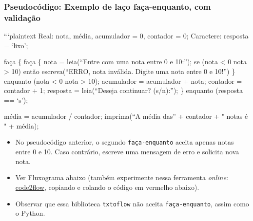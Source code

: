 \documentclass[12pt,a4paper]{article}
\providecommand{\tightlist}{%
      \setlength{\itemsep}{0pt}\setlength{\parskip}{0pt}}
\begin{document}
    \hypertarget{pseudocuxf3digo-exemplo-de-lauxe7o-fauxe7a-enquanto-com-validauxe7uxe3o}{%
\subsubsection{Pseudocódigo: Exemplo de laço faça-enquanto, com
validação}\label{pseudocuxf3digo-exemplo-de-lauxe7o-fauxe7a-enquanto-com-validauxe7uxe3o}}

```plaintext Real: nota, média, acumulador = 0, contador = 0; Caractere:
resposta = `lixo';

faça \{ faça \{ nota = leia(``Entre com uma nota entre 0 e 10:''); se
(nota \textless{} 0 \textbar{}\textbar{} nota \textgreater{} 10) então
escreva(``ERRO, nota inválida. Digite uma nota entre 0 e 10!'') \}
enquanto (nota \textless{} 0 \textbar{}\textbar{} nota \textgreater{}
10); acumulador = acumulador + nota; contador = contador + 1; resposta =
leia(``Deseja continuar? (s/n):''); \} enquanto (resposta == `s');

média = acumulador / contador; imprima(``A média das'' + contador + "
notas é " + média);

    \begin{itemize}
\tightlist
\item
  No pseudocódigo anterior, o segundo \texttt{faça-enquanto} aceita
  apenas notas entre 0 e 10. Caso contrário, escreve uma mensagem de
  erro e solicita nova nota.
\end{itemize}

    \begin{itemize}
\item
  Ver Fluxograma abaixo (também experimente nessa ferramenta
  \emph{online}: \href{https://app.code2flow.com/}{code2flow}, copiando
  e colando o código em vermelho abaixo).
\item
  Observar que essa biblioteca \texttt{txtoflow} não aceita
  \texttt{faça-enquanto}, assim como o Python.
\end{itemize}
\end{document}
